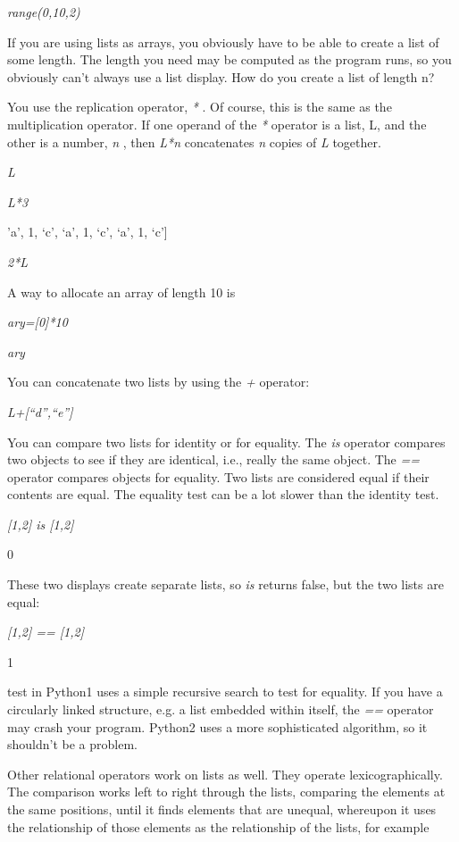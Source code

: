 \emph{range(0,10,2)}



If you are using lists as arrays,
you obviously have to be able to create a list of some length. The
length you need may be computed as the program runs, so you obviously
can't always use a list display. How do you create a list of length n?

You use the replication operator,
\emph{*} . Of course, this is the same as the multiplication operator.
If one operand of the \emph{*} operator is a list, L, and the other is a
number, \emph{n} , then \emph{L*n} concatenates \emph{n} copies of
\emph{L} together.


\emph{L}




\emph{L*3}

'a', 1, `c', `a', 1, `c', `a',
1, `c'{]}


\emph{2*L}



A way to allocate an array of
length 10 is


\emph{ary={[}0{]}*10}


\emph{ary}



You can concatenate two lists by
using the \emph{+} operator:


\emph{L+{[}``d'',``e''{]}}



You can compare two lists for
identity or for equality. The \emph{is} operator compares two objects to
see if they are identical, i.e., really the same object. The \emph{==}
operator compares objects for equality. Two lists are considered equal
if their contents are equal. The equality test can be a lot slower than
the identity test.


\emph{{[}1,2{]} is {[}1,2{]}}

0

These two displays create separate
lists, so \emph{is} returns false, but the two lists are equal:


\emph{{[}1,2{]} == {[}1,2{]}}

1

 test in
Python1 uses a simple recursive search to test for equality. If you have
a circularly linked structure, e.g. a list embedded within itself, the
\emph{==} operator may crash your program. Python2 uses a more
sophisticated algorithm, so it shouldn't be a problem.

Other relational operators work on
lists as well. They operate lexicographically. The comparison works left
to right through the lists, comparing the elements at the same
positions, until it finds elements that are unequal, whereupon it uses
the relationship of those elements as the relationship of the lists, for
example


